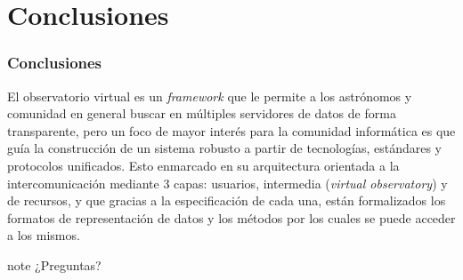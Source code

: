 \section{Conclusiones}

\begin{frame}
\frametitle{Conclusiones}

El observatorio virtual es un \textit{framework} que le permite a los astrónomos y
comunidad en general buscar en múltiples servidores de datos de forma
transparente, pero un foco de mayor interés para la comunidad informática es
que guía la construcción de un sistema robusto a partir de tecnologías,
estándares y protocolos unificados. Esto enmarcado en su arquitectura orientada
a la intercomunicación mediante 3 capas: usuarios, intermedia (\textit{virtual
observatory}) y de recursos, y que gracias a la especificación de cada una,
están formalizados los formatos de representación de datos y los métodos por
los cuales se puede acceder a los mismos.

\end{frame}

\begin{frame}
\begin{beamercolorbox}[center,shadow=true,rounded=true,]{note} 
        \huge ¿Preguntas? 
\end{beamercolorbox} 
\end{frame}
